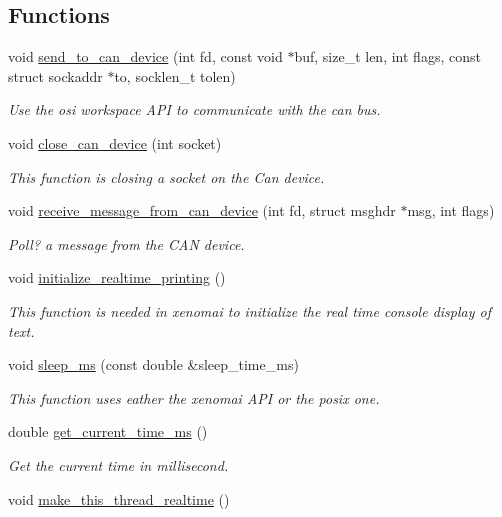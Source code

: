 \subsection*{Functions}
\begin{DoxyCompactItemize}
\item 
void \hyperlink{namespaceosi_a001686caee0f34611f14ab94c7303254}{send\+\_\+to\+\_\+can\+\_\+device} (int fd, const void $\ast$buf, size\+\_\+t len, int flags, const struct sockaddr $\ast$to, socklen\+\_\+t tolen)
\begin{DoxyCompactList}\small\item\em Use the osi workspace A\+PI to communicate with the can bus. \end{DoxyCompactList}\item 
void \hyperlink{namespaceosi_a92dc20de3b4933a10f24c98cecf2568b}{close\+\_\+can\+\_\+device} (int socket)
\begin{DoxyCompactList}\small\item\em This function is closing a socket on the Can device. \end{DoxyCompactList}\item 
void \hyperlink{namespaceosi_a244466c0afc9ae9fe059cee665fb0603}{receive\+\_\+message\+\_\+from\+\_\+can\+\_\+device} (int fd, struct msghdr $\ast$msg, int flags)
\begin{DoxyCompactList}\small\item\em Poll? a message from the C\+AN device. \end{DoxyCompactList}\item 
void \hyperlink{namespaceosi_a48e36c862c77befc86f53140722c3f43}{initialize\+\_\+realtime\+\_\+printing} ()\hypertarget{namespaceosi_a48e36c862c77befc86f53140722c3f43}{}\label{namespaceosi_a48e36c862c77befc86f53140722c3f43}

\begin{DoxyCompactList}\small\item\em This function is needed in xenomai to initialize the real time console display of text. \end{DoxyCompactList}\item 
void \hyperlink{namespaceosi_a499cdf6336a907d1327044b0f595f3a9}{sleep\+\_\+ms} (const double \&sleep\+\_\+time\+\_\+ms)
\begin{DoxyCompactList}\small\item\em This function uses eather the xenomai A\+PI or the posix one. \end{DoxyCompactList}\item 
double \hyperlink{namespaceosi_a2409ab591c4f78d9a8bcfbbe38df9429}{get\+\_\+current\+\_\+time\+\_\+ms} ()
\begin{DoxyCompactList}\small\item\em Get the current time in millisecond. \end{DoxyCompactList}\item 
void \hyperlink{namespaceosi_af6772d4aea95e99bc2bd0aabc557a20e}{make\+\_\+this\+\_\+thread\+\_\+realtime} ()\hypertarget{namespaceosi_af6772d4aea95e99bc2bd0aabc557a20e}{}\label{namespaceosi_af6772d4aea95e99bc2bd0aabc557a20e}


\end{DoxyCompactItemize}
